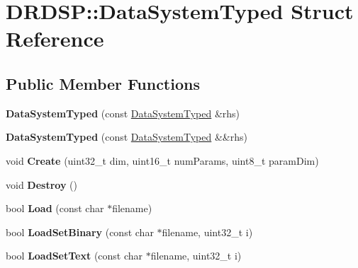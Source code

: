 \hypertarget{struct_d_r_d_s_p_1_1_data_system_typed}{\section{D\-R\-D\-S\-P\-:\-:Data\-System\-Typed Struct Reference}
\label{struct_d_r_d_s_p_1_1_data_system_typed}
}
\subsection*{Public Member Functions}
\begin{DoxyCompactItemize}
\item 
\hypertarget{struct_d_r_d_s_p_1_1_data_system_typed_aeca993ba97569b6cce26575df8fd71a2}{{\bfseries Data\-System\-Typed} (const \hyperlink{struct_d_r_d_s_p_1_1_data_system_typed}{Data\-System\-Typed} \&rhs)}\label{struct_d_r_d_s_p_1_1_data_system_typed_aeca993ba97569b6cce26575df8fd71a2}

\item 
\hypertarget{struct_d_r_d_s_p_1_1_data_system_typed_a36dcf2bd60c1e177507d1215ab8baf57}{{\bfseries Data\-System\-Typed} (const \hyperlink{struct_d_r_d_s_p_1_1_data_system_typed}{Data\-System\-Typed} \&\&rhs)}\label{struct_d_r_d_s_p_1_1_data_system_typed_a36dcf2bd60c1e177507d1215ab8baf57}

\item 
\hypertarget{struct_d_r_d_s_p_1_1_data_system_typed_acc04596b19fc88c69fcf404573e6dc3a}{void {\bfseries Create} (uint32\-\_\-t dim, uint16\-\_\-t num\-Params, uint8\-\_\-t param\-Dim)}\label{struct_d_r_d_s_p_1_1_data_system_typed_acc04596b19fc88c69fcf404573e6dc3a}

\item 
\hypertarget{struct_d_r_d_s_p_1_1_data_system_typed_a0ebf2395136854994f8dbc876b27ef16}{void {\bfseries Destroy} ()}\label{struct_d_r_d_s_p_1_1_data_system_typed_a0ebf2395136854994f8dbc876b27ef16}

\item 
\hypertarget{struct_d_r_d_s_p_1_1_data_system_typed_a98e789d6a53c5d8e0b78b53421d24164}{bool {\bfseries Load} (const char $\ast$filename)}\label{struct_d_r_d_s_p_1_1_data_system_typed_a98e789d6a53c5d8e0b78b53421d24164}

\item 
\hypertarget{struct_d_r_d_s_p_1_1_data_system_typed_a771a4fb04c009cab7a220aea627b68b3}{bool {\bfseries Load\-Set\-Binary} (const char $\ast$filename, uint32\-\_\-t i)}\label{struct_d_r_d_s_p_1_1_data_system_typed_a771a4fb04c009cab7a220aea627b68b3}

\item 
\hypertarget{struct_d_r_d_s_p_1_1_data_system_typed_a7a895514d71f542392931a54125bc69a}{bool {\bfseries Load\-Set\-Text} (const char $\ast$filename, uint32\-\_\-t i)}\label{struct_d_r_d_s_p_1_1_data_system_typed_a7a895514d71f542392931a54125bc69a}

\end{DoxyCompactItemize}
